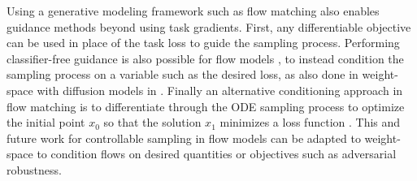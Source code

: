Using a generative modeling framework such as flow matching also enables guidance methods beyond using task gradients. First, any differentiable objective can be used in place of the task loss to guide the sampling process. Performing classifier-free guidance is also possible for flow models \citep{zhengGuidedFlowsGenerative2023}, to instead condition the sampling process on a variable such as the desired loss, as also done in weight-space with diffusion models in \citet{peeblesLearningLearnGenerative2022}. Finally an alternative conditioning approach in flow matching is to differentiate through the ODE sampling process to optimize the initial point $x_0$ so that the solution $x_1$ minimizes a loss function \citep{ben-hamuDFlowDifferentiatingFlows2024}. This and future work for controllable sampling in flow models can be adapted to weight-space to condition flows on desired quantities or objectives such as adversarial robustness. 
